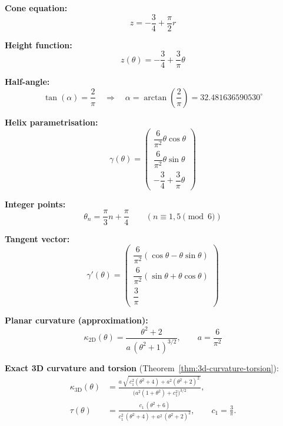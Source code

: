 \textbf{Cone equation:}
\begin{equation}
z = -\frac{3}{4} + \frac{\pi}{2}r
\end{equation}

\textbf{Height function:}
\begin{equation}
z(\theta) = -\frac{3}{4} + \frac{3}{\pi}\theta
\end{equation}

\textbf{Half-angle:}
\begin{equation}
\tan(\alpha) = \frac{2}{\pi}
\quad\Rightarrow\quad
\boxed{
\alpha = \arctan\!\left(\frac{2}{\pi}\right)
= 32.481636590530^\circ
}
\end{equation}

\textbf{Helix parametrisation:}
\begin{equation}
\boxed{
\gamma(\theta) =
\begin{pmatrix}
\dfrac{6}{\pi^2}\theta \cos\theta \\[6pt]
\dfrac{6}{\pi^2}\theta \sin\theta \\[6pt]
-\dfrac{3}{4} + \dfrac{3}{\pi}\theta
\end{pmatrix}
}
\end{equation}

\textbf{Integer points:}
\begin{equation}
\theta_n = \frac{\pi}{3}n + \frac{\pi}{4}
\qquad (n \equiv 1,5 \pmod{6})
\end{equation}

\textbf{Tangent vector:}
\begin{equation}
\gamma'(\theta) =
\begin{pmatrix}
\dfrac{6}{\pi^2}(\cos\theta - \theta\sin\theta) \\[6pt]
\dfrac{6}{\pi^2}(\sin\theta + \theta\cos\theta) \\[6pt]
\dfrac{3}{\pi}
\end{pmatrix}
\end{equation}

\textbf{Planar curvature (approximation):}
\begin{equation}
\kappa_{\mathrm{2D}}(\theta)
= \frac{\theta^2 + 2}{a\,(\theta^2 + 1)^{3/2}},
\qquad
a = \frac{6}{\pi^2}
\end{equation}

\textbf{Exact 3D curvature and torsion} (Theorem~\ref{thm:3d-curvature-torsion}):
\begin{align}
\kappa_{\mathrm{3D}}(\theta)
  &= \frac{a\,\sqrt{\,c_1^2(\theta^2+4) + a^2(\theta^2+2)^2\,}}
          {\bigl(a^2(1+\theta^2) + c_1^2\bigr)^{3/2}},\\[4pt]
\tau(\theta)
  &= \frac{c_1\,(\theta^2 + 6)}
          {c_1^2\,(\theta^2+4) + a^2\,(\theta^2+2)^2},
\qquad c_1 = \frac{3}{\pi}.
\end{align}

